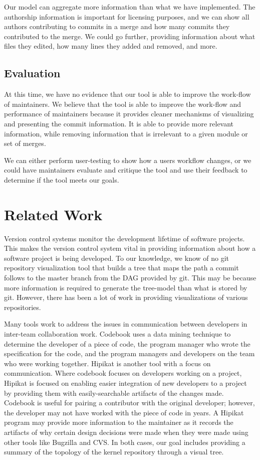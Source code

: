\documentclass[conference, draftclsnofoot, draft]{IEEEtran}
\begin{document}
Our model can aggregate more information than what we have implemented. The
authorship information is important for licensing purposes, and we can show all
authors contributing to commits in a  merge and how many commits they contributed to
the merge. We could go further, providing information about what files they edited,
how many lines they added and removed, and more.

\subsection{Evaluation}

At this time, we have no evidence that our tool is able to improve the work-flow of
maintainers. We believe that the tool is able to improve the work-flow and
performance of maintainers because it provides cleaner mechanisms of visualizing and
presenting the commit information. It is able to provide more relevant information,
while removing information that is irrelevant to a given module or set of merges.

We can either perform user-testing to show how a users workflow changes, or we could
have maintainers evaluate and critique the tool and use their feedback to determine
if the tool meets our goals.

\section{Related Work}

Version control systems monitor the development lifetime of software projects. This
makes the version control system vital in providing information about how a software
project is being developed. To our knowledge, we know of no git repository
visualization tool that builds a tree that maps the path a commit follows to the
master branch from the DAG provided by git. This may be because more information is
required to generate the tree-model than what is stored by git. However, there has
been a lot of work in providing visualizations of various repositories.

Many tools work to address the issues in communication between developers in
inter-team collaboration work. Codebook \cite{Begel2010} uses a data mining
technique  to determine the developer of a piece of code, the program manager who
wrote the specification for the code, and the program managers and developers on the
team who were working together. Hipikat\cite{Cubranic2005} is another tool with a
focus on communication. Where codebook focuses on developers working on a project,
Hipikat is focused on enabling easier integration of new developers to a project by
providing them with easily-searchable artifacts of the changes made. Codebook is
useful for pairing a contributor with the original developer; however, the developer
may not have worked with the piece of code in years. A Hipikat program may provide
more information to the maintainer as it records the artifacts of why certain
design decisions were made when they were made using other tools like Bugzilla and
CVS. In both cases, our goal includes providing a summary of the topology of the
kernel repository through a visual tree.
\end{document}
